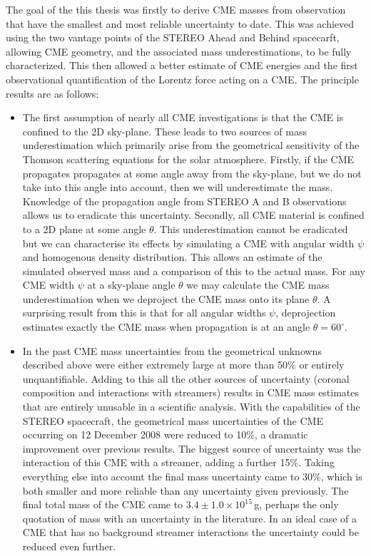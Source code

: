 The goal of the this thesis was firstly to derive CME masses from observation that have the smallest and most reliable uncertainty to date. This was achieved using the two vantage points of the STEREO Ahead and Behind spacecarft, allowing CME geometry, and the associated mass underestimations, to be fully characterized. This then allowed a better estimate of CME energies and the first observational quantification of the Lorentz force acting on a CME. The principle results are as follows:
\begin{itemize}
\item The first assumption of nearly all CME investigations is that the CME is confined to the 2D sky-plane. These leads to two sources of mass underestimation which primarily arise from the geometrical sensitivity of the Thomson scattering equations for the solar atmosphere. Firstly, if the CME propagates propagates at some angle away from the sky-plane, but we do not take into this angle into account, then we will underestimate the mass. Knowledge of the propagation angle from STEREO A and B observations allows us to eradicate this uncertainty. Secondly, all CME material is confined to a 2D plane at some angle $\theta$. This underestimation cannot be eradicated but we can characterise its effects by simulating a CME with angular width $\psi$ and homogenous density distribution. This allows an estimate of the simulated observed mass and a comparison of this to the actual mass. For any CME width $\psi$ at a sky-plane angle $\theta$ we may calculate the CME mass underestimation when we deproject the CME mass onto its plane $\theta$. A surprising result from this is that for all angular widths $\psi$, deprojection estimates exactly the CME mass when propagation is at an angle $\theta=60^{\circ}$.

\item In the past CME mass uncertainties from the geometrical unknowns described above were either extremely large at more than 50\% \citep{vou00} or entirely unquantifiable. Adding to this all the other sources of uncertainty (coronal composition and interactions with streamers) results in CME mass estimates that are entirely unusable in a scientific analysis. With the capabilities of the STEREO spacecraft, the geometrical mass uncertainties of the CME occurring on 12 December 2008 were reduced to 10\%, a dramatic improvement over previous results. The biggest source of uncertainty was the interaction of this CME with a streamer, adding a further 15\%. Taking everything else into account the final mass uncertainty came to 30\%, which is both smaller and more reliable than any uncertainty given previously. The final total mass of the CME came to
$3.4\pm1.0\times10^{15}$\,g, perhaps the only quotation of mass with an uncertainty in the literature. In an ideal case of a CME that has no background streamer interactions the uncertainty could be reduced even further.


\end{itemize}
